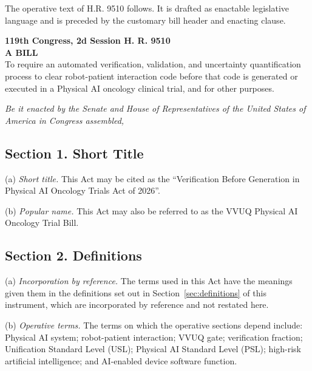 
The operative text of H.R. 9510 follows. It is drafted as enactable legislative
language and is preceded by the customary bill header and enacting clause.

\begin{flushleft}
\textbf{119th Congress, 2d Session \quad H. R. 9510}\\[3pt]
\textbf{A BILL}\\[2pt]
To require an automated verification, validation, and uncertainty quantification
process to clear robot-patient interaction code before that code is generated or
executed in a Physical AI oncology clinical trial, and for other purposes.
\end{flushleft}

\textit{Be it enacted by the Senate and House of Representatives of the United
States of America in Congress assembled,}

\subsection{Section 1. Short Title}

(a) \textit{Short title.} This Act may be cited as the ``Verification Before
Generation in Physical AI Oncology Trials Act of 2026''.

(b) \textit{Popular name.} This Act may also be referred to as the VVUQ Physical
AI Oncology Trial Bill.

\subsection{Section 2. Definitions}

(a) \textit{Incorporation by reference.} The terms used in this Act have the
meanings given them in the definitions set out in
Section~\ref{sec:definitions} of this instrument, which are incorporated by
reference and not restated here.

(b) \textit{Operative terms.} The terms on which the operative sections depend
include: Physical AI system; robot-patient interaction; VVUQ gate; verification
fraction; Unification Standard Level (USL); Physical AI Standard Level (PSL);
high-risk artificial intelligence; and AI-enabled device software function.


